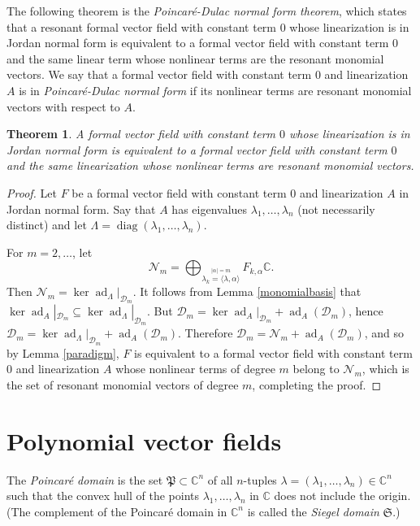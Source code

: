 \documentclass{article}
\newtheorem{theorem}{Theorem}
\newcommand{\diag}{\operatorname{diag}}
\newcommand{\ad}{\operatorname{ad}}
\begin{document}
 The following theorem is the {\em Poincar\'e-Dulac normal form theorem}, which states that a resonant formal vector field with constant term $0$ whose linearization is in Jordan normal form is equivalent to a formal vector field with
constant term $0$ and the same linear term whose nonlinear terms are the resonant monomial vectors. We say that a formal vector field with constant term $0$ and linearization $A$ is in {\em Poincar\'e-Dulac normal form} if its nonlinear terms
are resonant monomial vectors with respect to $A$.

\begin{theorem}
A formal vector field with constant term $0$  whose linearization is in Jordan normal form is equivalent to a formal vector field with constant term $0$ and the same linearization whose nonlinear terms are resonant monomial vectors.
\end{theorem}
\begin{proof}
Let $F$ be a formal vector field with constant term $0$ and linearization $A$ in Jordan normal form. Say
that $A$ has eigenvalues $\lambda_1,\ldots,\lambda_n$ (not necessarily distinct) and let $\Lambda=\diag(\lambda_1,\ldots,\lambda_n)$.

For $m=2,\ldots$, let 
\[
\mathscr{N}_m = \bigoplus_{\stackrel{|\alpha|=m}{\lambda_k=\langle \lambda,\alpha \rangle}}
F_{k,\alpha} \mathbb{C}.
\]
Then $\mathscr{N}_m=\ker \ad_\Lambda|_{\mathscr{D}_m}$.
It follows from Lemma \ref{monomialbasis} that $\ker \ad_A|_{\mathscr{D}_m} \subseteq \ker \ad_\Lambda|_{\mathscr{D}_m}$. But $\mathscr{D}_m=\ker \ad_A|_{\mathscr{D}_m}+\ad_A(\mathscr{D}_m)$, hence $\mathscr{D}_m=\ker \ad_\Lambda|_{\mathscr{D}_m}+\ad_A(\mathscr{D}_m)$.
Therefore $\mathscr{D}_m=\mathscr{N}_m+\ad_A(\mathscr{D}_m)$, and so by Lemma \ref{paradigm}, $F$ is equivalent to a formal vector field with constant term $0$ and linearization $A$ whose nonlinear terms of degree $m$ belong to
$\mathscr{N}_m$, which is the set of resonant monomial vectors of degree $m$, completing the proof.
\end{proof}

\section{Polynomial vector fields}
The {\em Poincar\'e domain} is the set $\mathfrak{P} \subset \mathbb{C}^n$ of all $n$-tuples $\lambda=(\lambda_1,\ldots,\lambda_n) \in \mathbb{C}^n$ such that the convex hull of the points $\lambda_1,\ldots,\lambda_n$  in $\mathbb{C}$  does not include the origin. (The complement of the Poincar\'e domain in $\mathbb{C}^n$ is called the {\em Siegel domain}
$\mathfrak{S}$.)
\end{document}
